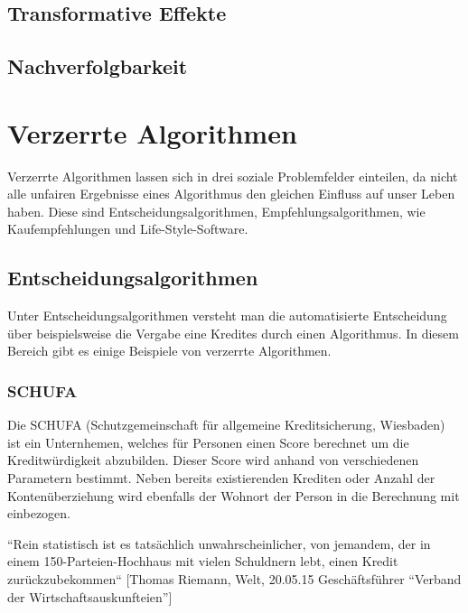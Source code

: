 \subsection{Transformative Effekte}


\subsection{Nachverfolgbarkeit}


\section{Verzerrte Algorithmen}

Verzerrte Algorithmen lassen sich in drei soziale Problemfelder einteilen, da nicht alle unfairen Ergebnisse eines Algorithmus den gleichen Einfluss auf unser Leben haben. 
Diese sind Entscheidungsalgorithmen, Empfehlungsalgorithmen, wie Kaufempfehlungen und Life-Style-Software.


\subsection{Entscheidungsalgorithmen}
Unter Entscheidungsalgorithmen versteht man die automatisierte Entscheidung über beispielsweise die Vergabe eine Kredites durch einen Algorithmus. In diesem Bereich gibt es einige Beispiele von verzerrte Algorithmen. 

\subsubsection{SCHUFA}
Die SCHUFA (Schutzgemeinschaft für allgemeine Kreditsicherung, Wiesbaden) ist ein Unternhemen, welches für Personen einen Score berechnet um die Kreditwürdigkeit abzubilden. Dieser Score wird anhand von verschiedenen Parametern bestimmt. Neben bereits existierenden Krediten oder Anzahl der Kontenüberziehung wird ebenfalls der Wohnort der Person in die Berechnung mit einbezogen. \newline

“Rein statistisch ist es tatsächlich unwahrscheinlicher, von jemandem, der in einem 150-Parteien-Hochhaus mit vielen Schuldnern lebt, einen Kredit zurückzubekommen“
[Thomas Riemann, Welt, 20.05.15 Geschäftsführer “Verband der Wirtschaftsauskunfteien”]

